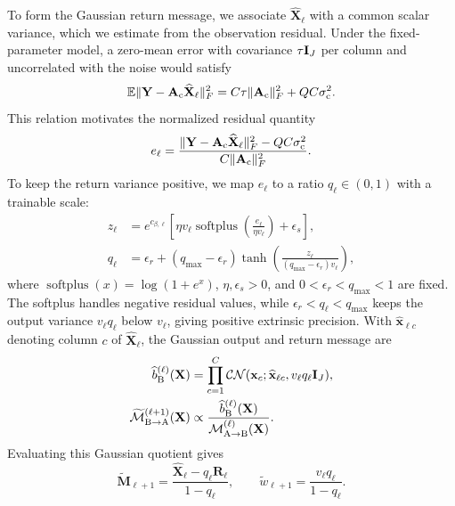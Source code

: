 To form the Gaussian return message, we associate
$\widehat{\mathbf X}_\ell$ with a common scalar variance, which we
estimate from the observation residual. Under the fixed-parameter
model, a zero-mean error with covariance $\tau\mathbf{I}_J$
per column and uncorrelated with the noise would satisfy
\[
 \mathbb{E}\|\mathbf Y-\mathbf A_{\rm c}\widehat{\mathbf X}_\ell\|_F^2
 =C\tau\|\mathbf A_{\rm c}\|_F^2+QC\sigma_{\rm c}^2.
\]
This relation motivates the normalized residual quantity
\begin{equation}
 e_\ell=\frac{\|\mathbf Y-\mathbf A_{\rm c}\widehat{\mathbf X}_\ell\|_F^2
                   -QC\sigma_{\rm c}^2}
                  {C\|\mathbf A_{\rm c}\|_F^2}.
 \label{eq:twc-residual-scale}
\end{equation}
To keep the return variance positive, we map $e_\ell$ to a ratio
$q_\ell\in(0,1)$ with a trainable scale:
\begin{equation}
 \begin{aligned}
 z_\ell&=e^{c_{\beta,\ell}}
 \left[\eta v_\ell\operatorname{softplus}
       \!\left(\frac{e_\ell}{\eta v_\ell}\right)+\epsilon_s\right],\\
 q_\ell&=\epsilon_r+(q_{\max}-\epsilon_r)
 \tanh\!\left(\frac{z_\ell}{(q_{\max}-\epsilon_r)v_\ell}\right),
 \end{aligned}
 \label{eq:twc-feedback-ratio}
\end{equation}
where $\operatorname{softplus}(x)=\log(1+e^x)$,
$\eta,\epsilon_s>0$, and $0<\epsilon_r<q_{\max}<1$ are fixed.
The softplus handles negative residual values, while
$\epsilon_r<q_\ell<q_{\max}$ keeps the output variance
$v_\ell q_\ell$ below $v_\ell$, giving positive extrinsic precision.
With $\widehat{\mathbf x}_{\ell c}$ denoting column $c$ of
$\widehat{\mathbf X}_\ell$, the Gaussian output and return message are
\begin{equation}
 \begin{aligned}
 \widehat b_{\rm B}^{(\ell)}(\mathbf X)
 &=\prod_{c=1}^{C}\mathcal{CN}(\mathbf x_c;
       \widehat{\mathbf x}_{\ell c},v_\ell q_\ell\mathbf{I}_J),\\
 \widetilde{\mathcal M}_{\rm B\to A}^{(\ell+1)}(\mathbf X)
 &\propto\frac{\widehat b_{\rm B}^{(\ell)}(\mathbf X)}
                 {\mathcal M_{\rm A\to B}^{(\ell)}(\mathbf X)}.
 \end{aligned}
 \label{eq:twc-feedback-message}
\end{equation}
Evaluating this Gaussian quotient gives
\begin{equation}
 \widetilde{\mathbf M}_{\ell+1}
 =\frac{\widehat{\mathbf X}_\ell-q_\ell\mathbf R_\ell}{1-q_\ell},
 \qquad
 \widetilde w_{\ell+1}=\frac{v_\ell q_\ell}{1-q_\ell}.
 \label{eq:twc-feedback-proposal}
\end{equation}
